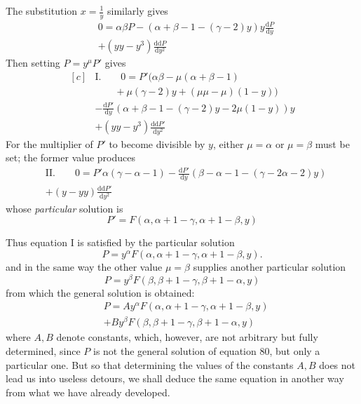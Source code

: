 The substitution \(x=\frac{1}{y}\) similarly gives
\[
\begin{aligned}&0=\alpha\beta P-(\alpha+\beta-1-(\gamma-2)y)y\frac{\mathrm{d}P}{\mathrm{d}y}\\&+(yy-y^3)\frac{\mathrm{d}\mathrm{d}P}{\mathrm{d}y^2}\end{aligned}
\]
Then setting \(P=y^\mu P'\) gives
\[
\begin{aligned}[c]
&\mathrm{I.}\qquad 0=P'(\alpha\beta-\mu(\alpha+\beta-1)\\&\qquad+\mu(\gamma-2)y+(\mu\mu-\mu)(1-y))\\
&-\frac{\mathrm{d}P'}{\mathrm{d}y}(\alpha+\beta-1-(\gamma-2)y-2\mu(1-y))y\\
&+(yy-y^3)\frac{\mathrm{d}\mathrm{d}P'}{\mathrm{d}y^2}
\end{aligned}
\]
For the multiplier of \(P'\) to become divisible by \(y\), either \(\mu=\alpha\) or \(\mu=\beta\) must be set; the former value produces
\[
\begin{aligned}&\mathrm{II.}\qquad
0=P'\alpha(\gamma-\alpha-1)-\frac{\mathrm{d}P'}{\mathrm{d}y}(\beta-\alpha-1-(\gamma-2\alpha-2)y)\\&+(y-yy)\frac{\mathrm{d}\mathrm{d}P'}{\mathrm{d}y^2}\end{aligned}
\]
whose \textit{particular} solution is
\[
P'=F(\alpha,\alpha+1-\gamma,\alpha+1-\beta,y)
\]
\par{}
Thus equation I is satisfied by the particular solution
\[
P=y^\alpha F(\alpha,\alpha+1-\gamma,\alpha+1-\beta,y).
\]
and in the same way the other value \(\mu=\beta\) supplies another particular solution
\[
P=y^\beta F(\beta,\beta+1-\gamma,\beta+1-\alpha,y)
\]
from which the general solution is obtained:
\[
\begin{aligned}&P=Ay^\alpha F(\alpha,\alpha+1-\gamma,\alpha+1-\beta,y)\\&+By^\beta F(\beta,\beta+1-\gamma,\beta+1-\alpha,y)\end{aligned}
\]
where \(A,B\) denote constants, which, however, are not arbitrary but fully determined, since \(P\) is not the general solution of equation 80, but only a particular one. But so that determining the values of the constants \(A,B\) does not lead us into useless detours, we shall deduce the same equation in another way from what we have already developed.


